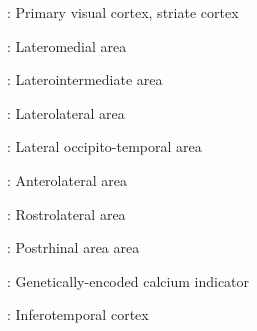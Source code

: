 
: Primary visual cortex, striate cortex

: Lateromedial area

: Laterointermediate area

: Laterolateral area

: Lateral occipito-temporal area

: Anterolateral area

: Rostrolateral area

: Postrhinal area area

: Genetically-encoded calcium indicator

: Inferotemporal cortex
